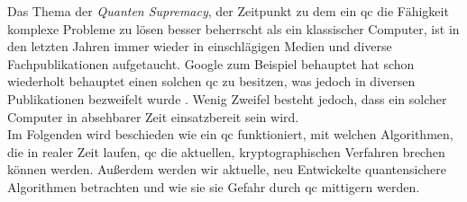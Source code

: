 Das Thema der \textit{Quanten Supremacy}, der Zeitpunkt zu dem ein \ac{qc} die Fähigkeit komplexe Probleme zu lösen besser beherrscht als ein klassischer Computer, ist in den letzten Jahren immer wieder in einschlägigen Medien und diverse Fachpublikationen aufgetaucht. Google zum Beispiel behauptet hat schon wiederholt behauptet einen solchen \ac{qc} zu besitzen, was jedoch in diversen Publikationen bezweifelt wurde \cite{cho_ordinary_2022}. Wenig Zweifel besteht jedoch, dass ein solcher Computer in absehbarer Zeit einsatzbereit sein wird.\\ %
Im Folgenden wird beschieden wie ein \ac{qc} funktioniert, mit welchen Algorithmen, die in realer Zeit laufen, \ac{qc} die aktuellen, kryptographischen Verfahren brechen können werden. Außerdem werden wir aktuelle, neu Entwickelte quantensichere Algorithmen betrachten und wie sie sie Gefahr durch \ac{qc} mittigern werden.